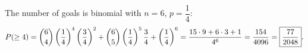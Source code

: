 The number of goals is binomial with $n=6$, $p=\dfrac{1}{4}$:
\[P(\ge4)=\dbinom64\left(\dfrac{1}{4}\right)^4\left(\dfrac{3}{4}\right)^2+\dbinom65\left(\dfrac{1}{4}\right)^5\dfrac{3}{4}+\left(\dfrac{1}{4}\right)^6=\dfrac{15\cdot9+6\cdot3+1}{4^6}=\dfrac{154}{4096}=\boxed{\dfrac{77}{2048}}.\]
